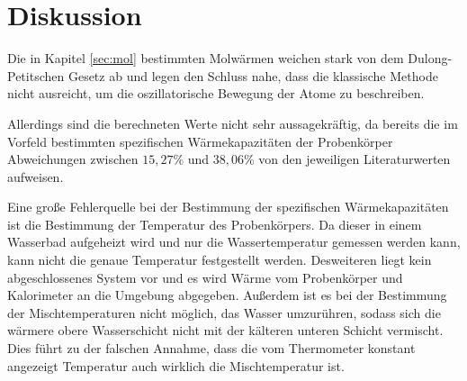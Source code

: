 \section{Diskussion}

Die in Kapitel \ref{sec:mol} bestimmten Molwärmen weichen stark von dem Dulong-Petitschen Gesetz ab und legen
den Schluss nahe, dass die klassische Methode nicht ausreicht, um die oszillatorische Bewegung der Atome zu
beschreiben.

Allerdings sind die berechneten Werte nicht sehr aussagekräftig, da bereits die im Vorfeld bestimmten
spezifischen Wärmekapazitäten der Probenkörper Abweichungen zwischen $15,27 \%$ und $38,06 \%$
von den jeweiligen Literaturwerten aufweisen.

Eine große Fehlerquelle bei der Bestimmung der spezifischen Wärmekapazitäten ist die Bestimmung der
Temperatur des Probenkörpers. Da dieser in einem Wasserbad aufgeheizt wird und nur die Wassertemperatur
gemessen werden kann, kann nicht die genaue Temperatur festgestellt werden.
Desweiteren liegt kein abgeschlossenes System vor und es wird Wärme vom Probenkörper und Kalorimeter an die
Umgebung abgegeben.
Außerdem ist es bei der Bestimmung der Mischtemperaturen nicht möglich, das Wasser umzurühren, sodass sich die
wärmere obere Wasserschicht nicht mit der kälteren unteren Schicht vermischt.
Dies führt zu der falschen Annahme, dass die vom Thermometer konstant angezeigt Temperatur auch wirklich die Mischtemperatur ist.
